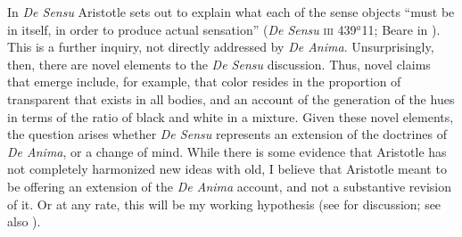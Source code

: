 In \emph{De Sensu} Aristotle sets out to explain what each of the sense objects ``must be in itself, in order to produce actual sensation'' (\emph{De Sensu} \textsc{iii} 439\( ^{a} \)11; Beare in \citealt[7]{Barnes:1984uq}). This is a further inquiry, not directly addressed by \emph{De Anima}. Unsurprisingly, then, there are novel elements to the \emph{De Sensu} discussion. Thus, novel claims that emerge include, for example, that color resides in the proportion of transparent that exists in all bodies, and an account of the generation of the hues in terms of the ratio of black and white in a mixture. Given these novel elements, the question arises whether \emph{De Sensu} represents an extension of the doctrines of \emph{De Anima}, or a change of mind. While there is some evidence that Aristotle has not completely harmonized new ideas with old, I believe that Aristotle meant to be offering an extension of the \emph{De Anima} account, and not a substantive revision of it. Or at any rate, this will be my working hypothesis (see \citealt{Kahn:1966zr} for discussion; see also \citealt[291]{Caston:2005cr} \citealt[37]{Nussbaum:1995ly}).

